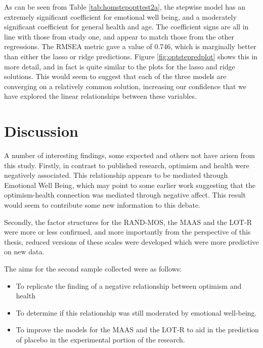\documentclass{article}
\begin{document}
As can be seen from Table \ref{tab:homstepopttest2a}, the stepwise model has an extremely significant coefficient for emotional well being, and a moderately significant coefficient for general health and age. The coefficient signs are all in line with those from study one, and appear to match those from the other regressions. The RMSEA metric gave a value of 0.746, which is marginally better than either the lasso or ridge predictions. Figure \ref{fig:optstepredplot} shows this in more detail, and in fact is quite similar to the plots for the lasso and ridge solutions. This would seem to suggest that each of the three models are converging on a relatively common solution, increasing our confidence that we have explored the linear relationships between these variables. 

\section{Discussion}
\label{sec:discussion}

A number of interesting findings, some expected and others not have arisen from this study. Firstly, in contrast to published research, optimism and health were negatively associated. This relationship appears to be mediated through Emotional Well Being, which may point to some earlier work suggesting that the optimism-health connection was mediated through negative affect. This result would seem to contribute some new information to this debate. 

Secondly, the factor structures for the RAND-MOS, the MAAS and the LOT-R were more or less confirmed, and more importantly from the perspective of this thesis, reduced versions of these scales were developed which were more predictive on new data. 

The aims for the second sample collected were as follows:

\begin{itemize}
\item To replicate the finding of a negative relationship between optimism and health

\item To determine if this relationship was still moderated by emotional well-being. 

\item To improve the models for the MAAS and the LOT-R to aid in the prediction of placebo in the experimental portion of the research. 
\end{itemize}
\end{document}
